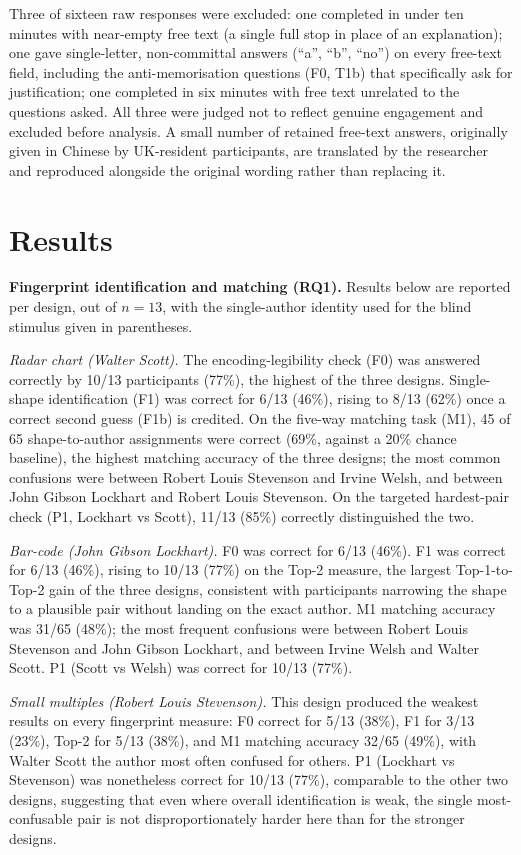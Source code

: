 \documentclass[logo,msc]{infthesis}
\begin{document}
Three of sixteen raw responses were excluded: one completed in under ten minutes with near-empty free text (a single full stop in place of an explanation); one gave single-letter, non-committal answers (``a'', ``b'', ``no'') on every free-text field, including the anti-memorisation questions (F0, T1b) that specifically ask for justification; one completed in six minutes with free text unrelated to the questions asked. All three were judged not to reflect genuine engagement and excluded before analysis. A small number of retained free-text answers, originally given in Chinese by UK-resident participants, are translated by the researcher and reproduced alongside the original wording rather than replacing it.

\section{Results}
\label{sec:fp-results}

\textbf{Fingerprint identification and matching (RQ1).} Results below are reported per design, out of $n=13$, with the single-author identity used for the blind stimulus given in parentheses.

\emph{Radar chart (Walter Scott).} The encoding-legibility check (F0) was answered correctly by 10/13 participants (77\%), the highest of the three designs. Single-shape identification (F1) was correct for 6/13 (46\%), rising to 8/13 (62\%) once a correct second guess (F1b) is credited. On the five-way matching task (M1), 45 of 65 shape-to-author assignments were correct (69\%, against a 20\% chance baseline), the highest matching accuracy of the three designs; the most common confusions were between Robert Louis Stevenson and Irvine Welsh, and between John Gibson Lockhart and Robert Louis Stevenson. On the targeted hardest-pair check (P1, Lockhart vs Scott), 11/13 (85\%) correctly distinguished the two.

\emph{Bar-code (John Gibson Lockhart).} F0 was correct for 6/13 (46\%). F1 was correct for 6/13 (46\%), rising to 10/13 (77\%) on the Top-2 measure, the largest Top-1-to-Top-2 gain of the three designs, consistent with participants narrowing the shape to a plausible pair without landing on the exact author. M1 matching accuracy was 31/65 (48\%); the most frequent confusions were between Robert Louis Stevenson and John Gibson Lockhart, and between Irvine Welsh and Walter Scott. P1 (Scott vs Welsh) was correct for 10/13 (77\%).

\emph{Small multiples (Robert Louis Stevenson).} This design produced the weakest results on every fingerprint measure: F0 correct for 5/13 (38\%), F1 for 3/13 (23\%), Top-2 for 5/13 (38\%), and M1 matching accuracy 32/65 (49\%), with Walter Scott the author most often confused for others. P1 (Lockhart vs Stevenson) was nonetheless correct for 10/13 (77\%), comparable to the other two designs, suggesting that even where overall identification is weak, the single most-confusable pair is not disproportionately harder here than for the stronger designs.
\end{document}
